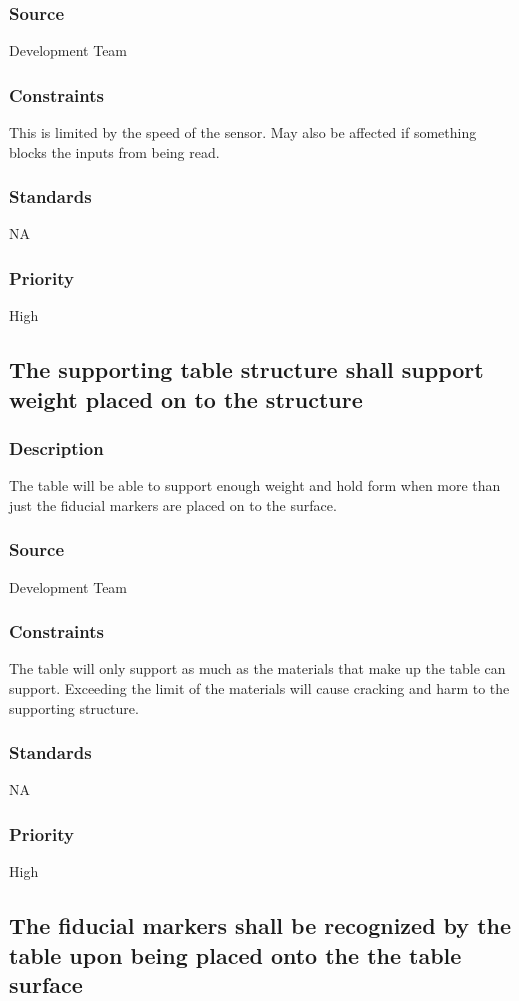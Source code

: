 \subsubsection{Source}
Development Team
\subsubsection{Constraints}
This is limited by the speed of the sensor. May also be affected if something blocks the inputs from being read. 
\subsubsection{Standards}
NA
\subsubsection{Priority}
High

\subsection{The supporting table structure shall support weight placed on to the structure }
\subsubsection{Description}
The table will be able to support enough weight and hold form when more than just the fiducial markers are placed on to the surface. 
\subsubsection{Source}
Development Team
\subsubsection{Constraints}
The table will only support as much as the materials that make up the table can support. Exceeding the limit of the materials will cause cracking and harm to the supporting structure. 
\subsubsection{Standards}
NA
\subsubsection{Priority}
High

\subsection{The fiducial markers shall be recognized by the table upon being placed onto the the table surface }
